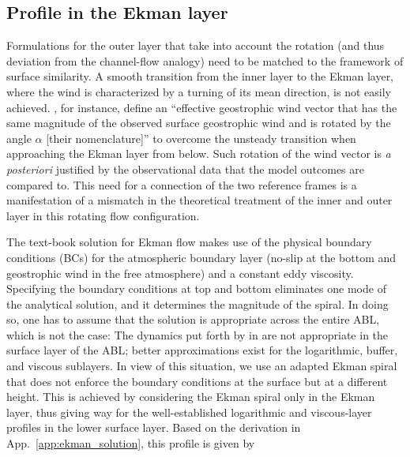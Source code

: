 \documentclass[a4paper,11pt]{amsart}
\begin{document}
\subsection{Profile in the Ekman layer}
\label{sec:ekman}
%
Formulations for the outer layer that take into account the rotation
(and thus deviation from the channel-flow analogy)
need to be matched to the framework of surface similarity.
%
A smooth transition from the inner layer to the Ekman layer, where the wind is characterized by a turning
of its mean direction, is not easily achieved. 
%
\cite{optis:BM2014}, for instance, define an ``effective geostrophic wind vector that has the same magnitude of the
observed surface geostrophic wind and is rotated by the angle $\alpha$ [their nomenclature]'' to overcome the
unsteady transition when approaching the Ekman layer from below.
%
Such rotation of the wind vector is \emph{a posteriori} justified by the observational data that the model outcomes are compared to.
%
This need for a connection of the two reference frames is a manifestation of a
mismatch in the theoretical treatment of the inner and outer layer in this rotating flow configuration. 
%
\par
%
The text-book solution for Ekman flow makes use of the physical boundary conditions (BCs) for the atmospheric
boundary layer (no-slip at the bottom and geostrophic wind in the free atmosphere) and a constant eddy
viscosity.
%
Specifying the boundary conditions at top and bottom eliminates one mode of the analytical solution, and
it determines the magnitude of the spiral.
%
In doing so, one has to assume that the solution is appropriate across the entire ABL, which is not the case:
The dynamics put forth by \citeauthor{ekman:AMA1905} in \citeyear{ekman:AMA1905}
are not appropriate in the surface layer of the ABL; better approximations exist for the logarithmic,
buffer, and viscous sublayers. 
%
In view of this situation, we use an adapted Ekman spiral that does not enforce the
boundary conditions at the surface but at a different height. 
%
This is achieved by considering the Ekman spiral only in the Ekman layer,
thus giving way for the well-established logarithmic and viscous-layer profiles in the
lower surface layer. 
%
Based on the derivation in App.~\ref{app:ekman_solution}, this profile is given by 
\end{document}
